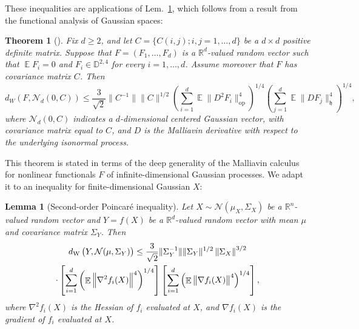 \documentclass{article}
\newtheorem{theorem}{Theorem}
\newtheorem{lemma}{Lemma}
\DeclareMathOperator{\expect}{\mathbb{E}}
\begin{document}
These inequalities are applications of Lem.~\ref{lem:second-order-poincare}, which follows from a result from the functional analysis of Gaussian spaces:
\begin{theorem}[{\citet[Theorem~7.1]{nourdin_second_2009}}]
\label{thm:second-order-poincare}
  Fix $d \ge 2$, and let $C = \{C(i, j); i, j = 1, \dots, d\}$ be a $d \times d$ positive definite matrix. Suppose that $F = (F_1, \dots, F_d)$ is a $\mathbb{R}^d$-valued random vector such that $\expect F_i = 0$ and $F_i \in \mathbb{D}^{2,4}$ for every $i=1, \dots, d$. Assume moreover that $F$ has covariance matrix $C$. Then
$$
d_W(F, \mathcal{N}_d(0, C)) \le \frac{3}{\sqrt 2} \|C^{-1}\| \|C\|^{1/2} \left(\sum_{i=1}^d \expect \|D^2 F_i\|_{\mathrm {op}}^4\right)^{1/4} \left(\sum_{j=1}^d \expect \|DF_j\|_{\mathfrak h}^4\right)^{1/4},
$$
where $\mathcal{N}_d(0, C)$ indicates a $d$-dimensional centered Gaussian vector, with covariance matrix equal to $C$,
and \(D\) is the Malliavin derivative with respect to the underlying isonormal process.
\end{theorem}
This theorem is stated in terms of the deep generality of the Malliavin calculus for nonlinear functionals \(F\) of infinite-dimensional Gaussian processes.
We adapt it to an inequality for finite-dimensional Gaussian \(X\):
\begin{lemma}[Second-order Poincar\'e inequality]
\label{lem:second-order-poincare}
Let \(X \sim \mathcal N(\mu_X, \Sigma_X)\) be a \(\mathbb{R}^n\)-valued random vector and \(Y = f(X)\) be a \(\mathbb{R}^d\)-valued random vector with mean \(\mu\) and covariance matrix \(\Sigma_Y\).
Then
\begin{multline*}
  d_\mathrm{W}\del{Y, \mathcal N(\mu, \Sigma_Y)}
  \leq \frac{3}{\sqrt 2} \|\Sigma_Y^{-1}\| \|\Sigma_Y\|^{1/2} \left\|\Sigma_X\right\|^{3/2}
  \\
  \cdot \sbr{\sum_{i = 1}^d \del{\expect \left\|\nabla^2 f_i(X)\right\|^4}^{1/4}}
  \sbr{\sum_{i = 1}^d \del{\expect \left\|\nabla f_i(X)\right\|^4}^{1/4}},
\end{multline*}
where \(\nabla^2f_i(X)\) is the Hessian of \(f_i\) evaluated at \(X\), and \(\nabla f_i(X)\) is the gradient of \(f_i\) evaluated at \(X\).
\end{lemma}
\end{document}
